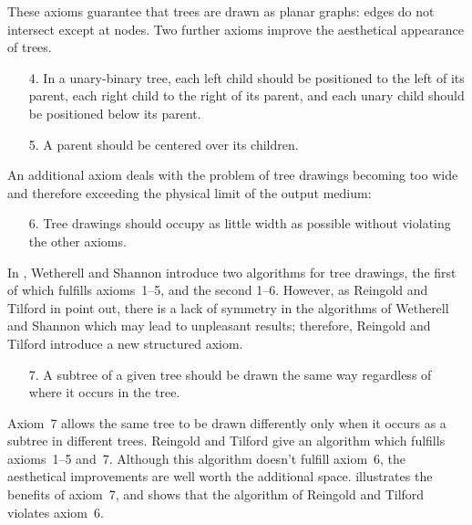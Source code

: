 These axioms guarantee that trees are drawn as planar graphs: edges do
not intersect except at nodes. Two further axioms improve the aesthetical
appearance of trees.

\begin{enumerate}
\item[4.] In a unary-binary tree, each left child should be positioned
          to the left of its parent, each
          right child to the right of its parent, and each unary child
          should be positioned below its parent.
\item[5.] A parent should be centered over its children.
\end{enumerate}

An additional axiom deals with the problem of tree drawings becoming too wide
and therefore exceeding the physical limit of the output medium:

\begin{enumerate}
\item[6.] Tree drawings should occupy as little width as possible without
          violating the other axioms.
\end{enumerate}

In \cite{TidyTrees}, Wetherell and Shannon introduce two algorithms for
tree drawings, the first of which fulfills axioms~1--5, and the second
1--6. However, as Reingold and Tilford in \cite{TidierTrees}
point out, there is a lack of symmetry in the algorithms of
Wetherell and Shannon which may lead to unpleasant results;
therefore, Reingold and Tilford introduce a new structured
axiom.

\begin{enumerate}
\item[7.] A subtree of a given tree should be
          drawn the same way regardless of where it occurs in the tree.
\end{enumerate}

Axiom~7 allows the same tree to be drawn differently only when it occurs as
a subtree in different trees.
Reingold and Tilford give an algorithm which fulfills axioms~1--5
and~7. Although
this algorithm doesn't fulfill axiom~6,
the aesthetical improvements are well worth the additional space.
 illustrates the benefits of axiom~7, and 
shows that the algorithm of Reingold and Tilford violates axiom~6.

